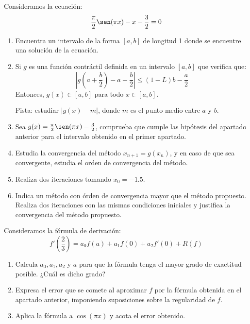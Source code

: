 \documentclass[12pt]{article}
\begin{document}
    \begin{ejercicio}
        Consideramos la ecuación:
        \begin{equation*}
            \dfrac{\pi}{2} \sen(\pi x) - x - \dfrac{3}{2} = 0
        \end{equation*}
        \begin{enumerate}[label=\alph*)]
            \item Encuentra un intervalo de la forma $[a,b]$ de longitud 1 donde se encuentre una solución de la ecuación.
            \item Si $g$ es una función contráctil definida en un intervalo $[a,b]$ que verifica que:
                \begin{equation*}
                    \left|g\left(a+\frac{b}{2}\right) - a + \frac{b}{2}\right| \leq (1-L)b - \frac{a}{2}
                \end{equation*}
                Entonces, $g(x) \in [a,b]$ para todo $x\in [a,b]$.\newline

                Pista: estudiar $|g(x) - m|$, donde $m$ es el punto medio entre $a$ y $b$.
            \item Sea $g(x) = \frac{\pi}{2}\sen(\pi x) - \frac{3}{2}$, comprueba que cumple las hipótesis del apartado anterior para el intervalo obtenido en el primer apartado.
            \item Estudia la convergencia del método $x_{n+1} = g(x_n)$, y en caso de que sea convergente, estudia el orden de convergencia del método.
            \item Realiza dos iteraciones tomando $x_0 = -1.5$.
            \item Indica un método con órden de convergencia mayor que el método propuesto. Realiza dos iteraciones con las mismas condiciones iniciales y justifica la convergencia del método propuesto.
        \end{enumerate}
    \end{ejercicio}

    \begin{ejercicio}
        Consideramos la fórmula de derivación:
        \begin{equation*}
            f'\left(\dfrac{2}{3}\right) = a_0 f(a) + a_1f(0) + a_2 f'(0) + R(f)
        \end{equation*}
        \begin{enumerate}[label=\alph*)]
            \item Calcula $a_0,a_1,a_2$ y $a$ para que la fórmula tenga el mayor grado de exactitud posible. ¿Cuál es dicho grado?
            \item Expresa el error que se comete al aproximar $f$ por la fórmula obtenida en el apartado anterior, imponiendo suposiciones sobre la regularidad de $f$.
            \item Aplica la fórmula a $\cos(\pi x)$ y acota el error obtenido.
        \end{enumerate}
    \end{ejercicio}
\end{document}
